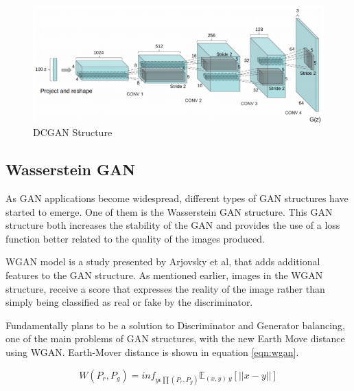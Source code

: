 \begin{figure}[h]
    \centering
    \includegraphics[scale=0.8]{figures/chapter3/dc-gan-structure.png}
    \caption{DCGAN Structure}
    \label{fig:dcgan}
\end{figure}

\subsection{Wasserstein GAN}

As GAN applications become widespread, different types of GAN structures have started to emerge. One of them is the Wasserstein GAN structure. This GAN structure both increases the stability of the GAN and provides the use of a loss function better related to the quality of the images produced.

WGAN model is a study presented by Arjovsky et al\cite{wgan}, that adds additional features to the GAN structure. As mentioned earlier, images in the WGAN structure, receive a score that expresses the reality of the image rather than simply being classified as real or fake by the discriminator.

Fundamentally plans to be a solution to Discriminator and Generator balancing, one of the main problems of GAN structures, with the new Earth Move distance using WGAN. Earth-Mover distance is shown in equation \ref{eqn:wgan}.

\begin{equation}
\label{eqn:wgan}
    W(P_r, P_g)= {inf}_{y\epsilon\prod (P_r,P_g)}\mathbb{E}_{(x,y)~y}[||x-y||]
\end{equation}
